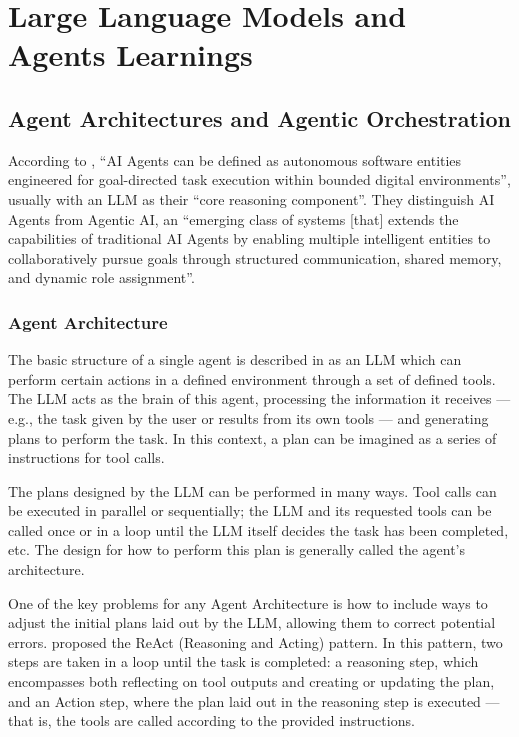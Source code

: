 \documentclass[a4paper]{report}
\begin{document}
\section{Large Language Models and Agents Learnings}
\label{sec:research-llms}

\subsection{Agent Architectures and Agentic Orchestration}

According to \cite{sapkota2025aiagentsvsagentic}, ``AI Agents can be defined as autonomous software entities engineered for goal-directed task execution within bounded digital environments'', usually with an LLM as their ``core reasoning component''. They distinguish AI Agents from Agentic AI, an ``emerging class of systems [that] extends the capabilities of traditional AI Agents by enabling multiple intelligent entities to collaboratively pursue goals through structured communication, shared memory, and dynamic role assignment''.

\subsubsection{Agent Architecture}

The basic structure of a single agent is described in \cite{aiebook2025} as an LLM which can perform certain actions in a defined environment through a set of defined tools. The LLM acts as the brain of this agent, processing the information it receives --- e.g., the task given by the user or results from its own tools --- and generating plans to perform the task. In this context, a plan can be imagined as a series of instructions for tool calls.

The plans designed by the LLM can be performed in many ways. Tool calls can be executed in parallel or sequentially; the LLM and its requested tools can be called once or in a loop until the LLM itself decides the task has been completed, etc. The design for how to perform this plan is generally called the agent's architecture.

One of the key problems for any Agent Architecture is how to include ways to adjust the initial plans laid out by the LLM, allowing them to correct potential errors. \cite{yao2023react} proposed the ReAct (Reasoning and Acting) pattern. In this pattern, two steps are taken in a loop until the task is completed: a reasoning step, which encompasses both reflecting on tool outputs and creating or updating the plan, and an Action step, where the plan laid out in the reasoning step is executed --- that is, the tools are called according to the provided instructions.
\end{document}

